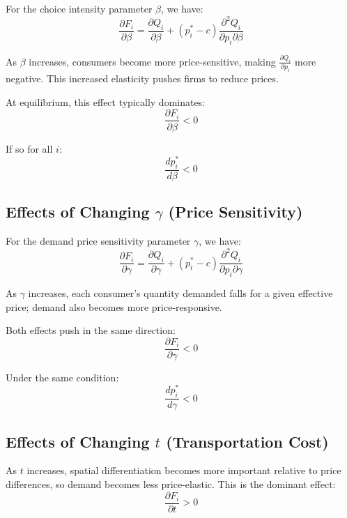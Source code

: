 \documentclass{article}
\begin{document}
For the choice intensity parameter $\beta$, we have:
\begin{equation}
  \frac{\partial F_i}{\partial \beta} = \frac{\partial Q_i}{\partial \beta} + (p_i^* - c)\frac{\partial^2 Q_i}{\partial p_i \partial \beta}
\end{equation}

As $\beta$ increases, consumers become more price-sensitive, making $\frac{\partial Q_i}{\partial p_i}$ more negative. This increased elasticity pushes firms to reduce prices.

At equilibrium, this effect typically dominates:
\begin{equation}
  \frac{\partial F_i}{\partial \beta} < 0
\end{equation}

If so for all $i$:
\begin{equation}
  \frac{dp_i^*}{d\beta} < 0
\end{equation}

\subsection{Effects of Changing $\gamma$ (Price Sensitivity)}

For the demand price sensitivity parameter $\gamma$, we have:
\begin{equation}
  \frac{\partial F_i}{\partial \gamma} = \frac{\partial Q_i}{\partial \gamma} + (p_i^* - c)\frac{\partial^2 Q_i}{\partial p_i \partial \gamma}
\end{equation}

As $\gamma$ increases, each consumer's quantity demanded falls for a given effective price; demand also becomes more price-responsive.

Both effects push in the same direction:
\begin{equation}
  \frac{\partial F_i}{\partial \gamma} < 0
\end{equation}

Under the same condition:
\begin{equation}
  \frac{dp_i^*}{d\gamma} < 0
\end{equation}

\subsection{Effects of Changing $t$ (Transportation Cost)}

As $t$ increases, spatial differentiation becomes more important relative to price differences, so demand becomes less price-elastic. This is the dominant effect:
\begin{equation}
  \frac{\partial F_i}{\partial t} > 0
\end{equation}
\end{document}
